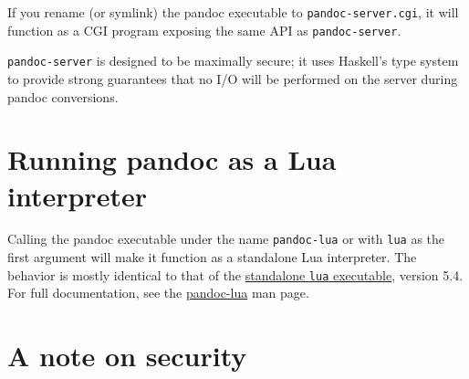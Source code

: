 \documentclass[
  b5paper
]{book}
\begin{document}
If you rename (or symlink) the pandoc executable to
\texttt{pandoc-server.cgi}, it will function as a CGI program exposing
the same API as \texttt{pandoc-server}.

\texttt{pandoc-server} is designed to be maximally secure; it uses
Haskell's type system to provide strong guarantees that no I/O will be
performed on the server during pandoc conversions.

\chapter{Running pandoc as a Lua
interpreter}\label{running-pandoc-as-a-lua-interpreter}

Calling the pandoc executable under the name \texttt{pandoc-lua} or with
\texttt{lua} as the first argument will make it function as a standalone
Lua interpreter. The behavior is mostly identical to that of the
\href{https://www.lua.org/manual/5.4/manual.html\#7}{standalone
\texttt{lua} executable}, version 5.4. For full documentation, see the
\href{https://github.com/jgm/pandoc/blob/master/doc/pandoc-lua.md}{pandoc-lua}
man page.

\chapter{A note on security}\label{a-note-on-security}
\end{document}
